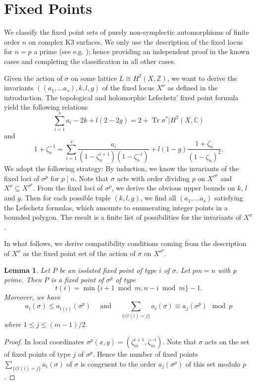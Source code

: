 \documentclass[a4paper]{amsart}
\theoremstyle{definition}
\theoremstyle{plain}
\newtheorem{lemma}[definition]{Lemma}
\DeclareMathOperator{\Tr}{Tr}
\newcommand{\CC}{\mathbb{C}}
\newcommand{\ZZ}{\mathbb{Z}}
\begin{document}
%
%
%
%
%
%
%
%
%
%
%
%
%
%
%
%
%
%
%
%
%
%
%
%
%
%
%
%
%
%
%
%
%
%
%
%
%
%


\section{Fixed Points}\label{sec:fixed}
We classify the fixed point sets of purely non-symplectic automorphisms of finite order $n$ on complex K3 surfaces.
We only use the description of the fixed locus for $n=p$ a prime (see e.g. \cite{artebani-sarti-taki}); hence providing an independent proof in the known cases and completing the classification in all other cases.

Given the action of $\sigma$ on some lattice $L \cong H^2(X,\ZZ)$, we want to derive the invariants $((a_1,\dots a_s),k,l,g)$
of the fixed locus $X^\sigma$ as defined in the introduction.
The topological and holomorphic Lefschetz' fixed point formula \cite[Thm. 4.6]{atiyah-singer1968} yield the following relations
\[\sum_{i=1}^s a_i -2k + l(2 - 2g)
= 2 + \Tr \sigma^*|H^2(X,\CC)\]
and
\[1+\zeta_n^{-1} = \sum_{i=1}^s \frac{a_i}{(1-\zeta_n^{i+1})(1-\zeta_n^{-i})}+l(1-g) \frac{1+\zeta_n}{(1-\zeta_n)^2}.\]
We adopt the following strategy:
By induction, we know the invariants of the fixed loci of $\sigma^p$ for $p \mid n$.
Note that $\sigma$ acts with order dividing $p$ on $X^{\sigma^p}$ and $X^\sigma \subseteq X^{\sigma^p}$.
From the fixed loci of $\sigma^p$, we derive
the obvious upper bounds on $k$, $l$ and $g$.
Then for each possible tuple $(k,l,g)$, we find all $(a_1,\dots a_s)$ satisfying the Lefschetz formulas, which amounts to enumerating integer points in a bounded polygon.
The result is a finite list of possibilities for the invariants of $X^\sigma$.

In what follows, we derive compatibility conditions coming from the description of $X^\sigma$ as the fixed point set of the action of $\sigma$ on $X^{\sigma^p}$.
\begin{lemma}\label{fixed points on curves}
 Let $P$ be an isolated fixed point of type $i$ of $\sigma$. Let $p m = n$ with $p$ prime. Then $P$ is a fixed point of $\sigma^p$ of type
 \[t(i) = \min\{i + 1 \bmod m,n -i \bmod m\} - 1.\]
 Moreover, we have
 \[a_i(\sigma) \leq a_{t(i)}(\sigma^p) \quad \mbox{ and } \quad \sum_{\{i | t(i)=j\}}a_i(\sigma) \equiv a_{j}(\sigma^p) \mod p\]
  where $1 \leq j \leq (m-1)/2$.
\end{lemma}
\begin{proof}
  In local coordinates $\sigma^p(x,y) = (\zeta_m^{i+1},\zeta_m^{-i})$. Note that $\sigma$ acts on the set of fixed points of type $j$ of $\sigma^p$. Hence the number of fixed points $ \sum_{\{i|t(i)=j\}}a_i(\sigma)$ of $\sigma$ is congruent to the order $a_j(\sigma^p)$ of this set modulo $p$.
\end{proof}
\end{document}

